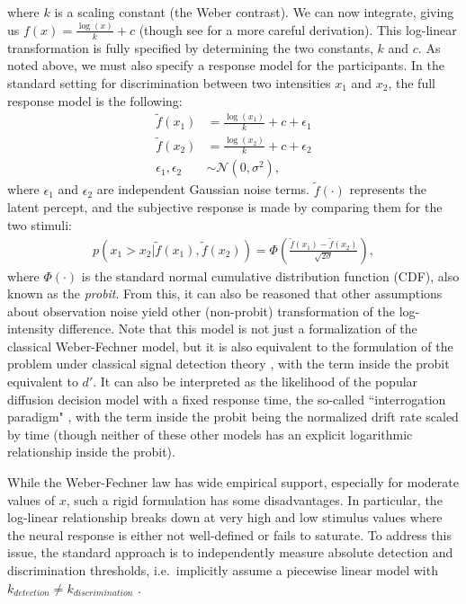 \documentclass[../main.tex]{subfiles}
\begin{document}
where $k$ is a scaling constant (the Weber contrast). We can now integrate, giving us $f(x) = \frac{\log(x)}{k} + c$ (though see \citet{Dzhafarov2011} for a more careful derivation). This log-linear transformation is fully specified by determining the two constants, $k$ and $c$.
As noted above, we must also specify a response model for the participants. In the standard setting for discrimination between two intensities $x_1$ and $x_2$, the full response model is the following:
\begin{align}
\tilde{f}(x_1) &= \frac{\log(x_1)}{k} + c + \epsilon_1\\
\tilde{f}(x_2) &= \frac{\log(x_2)}{k} + c + \epsilon_2\\
\epsilon_1, \epsilon_2 &\sim \mathcal{N}(0, \sigma^2),
\end{align}
where $\epsilon_1$ and $\epsilon_2$ are independent Gaussian noise terms. $\tilde{f}(\cdot)$ represents the latent percept, and the subjective response is made by comparing them for the two stimuli:
\begin{align}
p( x_1 > x_2 | \tilde{f}(x_1), \tilde{f}(x_2)) = \Phi\left(\frac{\tilde{f}(x_1)-\tilde{f}(x_2)}{\sqrt{2\sigma}}\right),
\end{align}
where $\Phi(\cdot)$ is the standard normal cumulative distribution function (CDF), also known as the \emph{probit}.
From this, it can also be reasoned that other assumptions about observation noise yield other (non-probit)
transformation of the log-intensity difference. Note that this model is not just a formalization of the
classical Weber-Fechner model, but it is also equivalent to the formulation of the problem under classical
signal detection theory \citep{Green1966}, with the term inside the probit equivalent to $d'$. It can also
be interpreted as the likelihood of the popular diffusion decision model with a fixed response time, the
so-called ``interrogation paradigm" \citep{Bogacz2006}, with the term inside the probit being the
normalized drift rate scaled by time (though neither of these other models has an explicit logarithmic relationship inside the probit).

While the Weber-Fechner law has wide empirical support, especially for moderate values of $x$, such a rigid formulation has some disadvantages. In particular, the log-linear relationship breaks down at very high and low stimulus values where the neural response is either not well-defined or fails to saturate. To address this issue, the standard approach is to independently measure absolute detection and discrimination thresholds, i.e.\ implicitly assume a piecewise linear model with $k_{detection}\ne k_{discrimination}$ \citep[e.g][]{Aguilar1954,Legge1984,Foley1981,Mikkelsen2020}.
\end{document}
